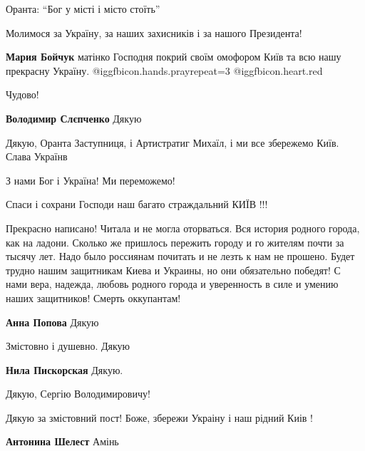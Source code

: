  
 
 
 
 
\zzSecCmt

\begin{itemize} %
Оранта: \enquote{Бог у місті і місто стоїть}

Молимося за Україну, за наших захисників і за нашого Президента!

\textbf{Мария Бойчук} матінко Господня покрий своїм омофором Київ та всю нашу прекрасну Україну.  @igg{fbicon.hands.pray}{repeat=3} @igg{fbicon.heart.red}

Чудово!

\textbf{Володимир Слєпченко} Дякую

Дякую, Оранта Заступниця, і Артистратиг Михаїл, і ми все збережемо Київ. Слава Українв

З нами Бог і Україна! Ми переможемо!

Спаси і сохрани Господи наш багато страждальний КИЇВ !!!


Прекрасно написано! Читала и не могла оторваться. Вся история родного города,
как на ладони. Сколько же пришлось пережить городу и го жителям почти за тысячу
лет. Надо было россиянам почитать и не лезть к нам не прошено. Будет трудно
нашим защитникам Киева и Украины, но они обязательно победят! С нами вера,
надежда, любовь родного города и уверенность в силе и умению наших защитников!
Смерть оккупантам!

\textbf{Анна Попова} Дякую

Змістовно і душевно. Дякую

\textbf{Нила Пискорская} Дякую.

Дякую, Сергію Володимировичу!

Дякую за змістовний пост! Боже, збережи Украіну і наш рідний Киів !

\textbf{Антонина Шелест} Амінь


\end{itemize}
